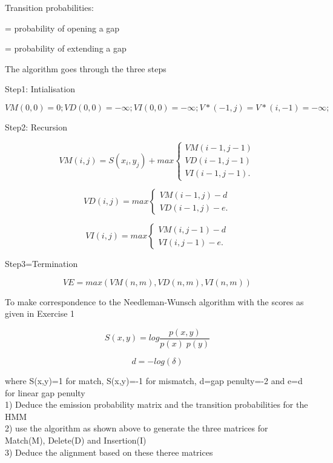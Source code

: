 \documentclass[a4paper,11pt]{article}
\DeclareRobustCommand{\greektext}{%
  \fontencoding{LGR}\selectfont\def\encodingdefault{LGR}}
\DeclareRobustCommand{\textgreek}[1]{\leavevmode{\greektext #1}}
\begin{document}
Transition probabilities:

\textgreek{d} = probability of opening a gap

\textgreek{e} = probability of extending a gap

The algorithm goes through the three steps


Step1: Intialisation




\[
VM(0,0)=0; VD(0,0)=-\infty ; VI(0,0)=-\infty;
V*(-1,j)=V*(i,-1)=-\infty;\]


Step2: Recursion

\[ VM(i,j) =S(x_{i},y_{j})+max \left\{ \begin{array}{ll}
	 VM(i-1,j-1)\\
         VD(i-1,j-1) \\
         VI(i-1,j-1)  .\end{array} \right. \] 

\[ VD(i,j) =max \left\{ \begin{array}{ll}
         VM(i-1,j)-d \\
         VD(i-1,j)-e  .\end{array} \right. \] 

\[ VI(i,j) =max \left\{ \begin{array}{ll}
         VM(i,j-1)-d \\
         VI(i,j-1)-e  .\end{array} \right. \]



Step3=Termination

\[ VE=max(VM(n,m),VD(n,m),VI(n,m))\]

   


To make correspondence to the Needleman-Wunsch algorithm with the scores as given in Exercise 1

\[
S(x,y)=log\frac{p(x,y)}{p(x)\; p(y)}\]

\[
d=-log(\delta)\]

where S(x,y)=1 for match, S(x,y)=-1 for mismatch, d=gap penulty=-2 and e=d for linear gap penulty\\

1) Deduce the emission probability matrix and the transition probabilities for the HMM \\
2) use the algorithm as shown above to generate the three matrices for Match(M), Delete(D) and Insertion(I)\\
3) Deduce the alignment based on these theree matrices
\end{document}
